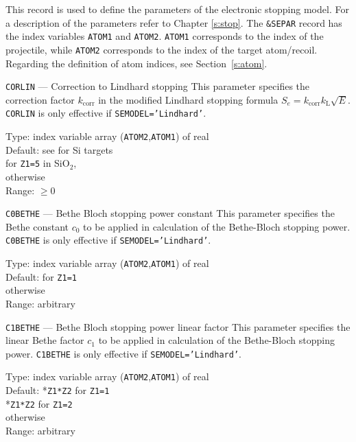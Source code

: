 This record is used to define the parameters of the electronic stopping model.
For a description of the parameters refer to Chapter \ref{s:stop}. The
\texttt{\&SEPAR} record has the index variables \texttt{ATOM1} and
\texttt{ATOM2}. \texttt{ATOM1} corresponds to the index of the projectile, while
\texttt{ATOM2} corresponds to the index of the target atom/recoil. Regarding the
definition of atom indices, see Section~\ref{s:atom}.

\begin{keydescription}{\texttt{CORLIN} --- Correction to Lindhard stopping}
%
  This parameter specifies the correction factor $k_\mathrm{corr}$ in the modified 
  Lindhard stopping formula $S_e=k_\mathrm{corr} k_\mathrm{L} \sqrt{E}$.  
  \texttt{CORLIN} is only effective if \texttt{SEMODEL='Lindhard'}.
  \begin{keytab}
    Type:    \> index variable array (\texttt{ATOM2},\texttt{ATOM1}) 
                of real \\
    Default: \> see \cite{I0104} for Si targets \\
              for \texttt{Z1=5} in SiO$_2$, \\
              otherwise \\
    Range:   \> $\ge 0$
  \end{keytab}
\end{keydescription}

\begin{keydescription}{\texttt{C0BETHE} --- Bethe Bloch stopping power constant}
%
  This parameter specifies the Bethe constant $c_0$ to be applied in
  calculation of the Bethe-Bloch stopping power.
  \texttt{C0BETHE} is only effective if \texttt{SEMODEL='Lindhard'}.

  \begin{keytab}
    Type:    \> index variable array (\texttt{ATOM2},\texttt{ATOM1}) 
                of real \\
    Default:  for \texttt{Z1=1} \cite{Hob05a} \\
              otherwise \\
    Range:   \> arbitrary
  \end{keytab}
\end{keydescription}
%

\begin{keydescription}{\texttt{C1BETHE} --- Bethe Bloch stopping power linear factor}
%
  This parameter specifies the linear Bethe factor $c_1$ to be applied in
  calculation of the Bethe-Bloch stopping power.
  \texttt{C1BETHE} is only effective if \texttt{SEMODEL='Lindhard'}.

  \begin{keytab}
    Type:    \> index variable array (\texttt{ATOM2},\texttt{ATOM1}) 
                of real \\
    Default: *\texttt{Z1*Z2} for \texttt{Z1=1} \cite{Hob05a}\\
             *\texttt{Z1*Z2} for \texttt{Z1=2} \\
	      otherwise \\
    Range:   \> arbitrary
  \end{keytab}
\end{keydescription}

